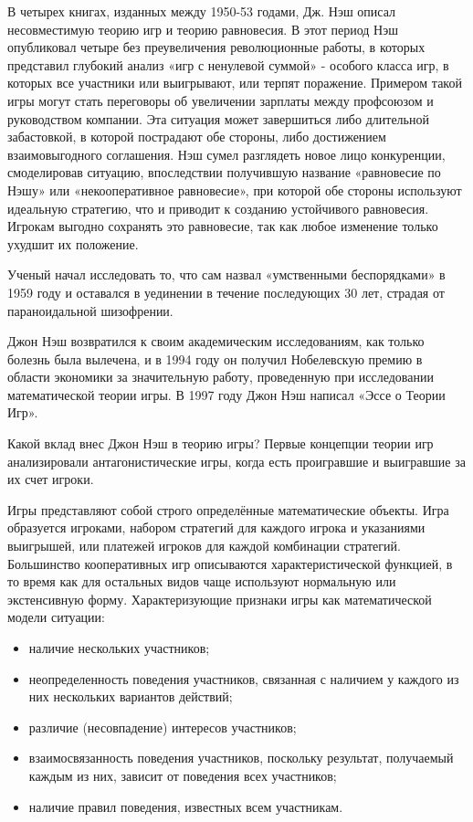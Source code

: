 \documentclass[12pt, a4paper]{article}
\begin{document}
В четырех книгах, изданных между 1950-53 годами, Дж. Нэш описал несовместимую
теорию игр и теорию равновесия. В этот период Нэш опубликовал четыре без
преувеличения революционные работы, в которых представил глубокий анализ
«игр с ненулевой суммой» - особого класса игр, в которых все участники или
выигрывают, или терпят поражение. Примером такой игры могут стать
переговоры об увеличении зарплаты между профсоюзом и руководством компании.
Эта ситуация может завершиться либо длительной забастовкой, в которой
пострадают обе стороны, либо достижением взаимовыгодного соглашения. Нэш сумел
разглядеть новое лицо конкуренции, смоделировав ситуацию, впоследствии
получившую название «равновесие по Нэшу» или «некооперативное равновесие»,
при которой обе стороны используют идеальную стратегию, что и приводит к
созданию устойчивого равновесия. Игрокам выгодно сохранять это равновесие,
так как любое изменение только ухудшит их положение\cite{vm03}.

Ученый начал исследовать то, что сам назвал «умственными беспорядками» в
1959 году и оставался в уединении в течение последующих 30 лет, страдая от
параноидальной шизофрении.

Джон Нэш возвратился к своим академическим исследованиям, как только болезнь
была вылечена, и в 1994 году он получил Нобелевскую премию в области экономики
за значительную работу, проведенную при исследовании математической теории
игры. В 1997 году Джон Нэш написал «Эссе о Теории Игр».

Какой вклад внес Джон Нэш в теорию игры?
Первые концепции теории игр анализировали антагонистические игры, когда
есть проигравшие и выигравшие за их счет игроки.

Игры представляют собой строго определённые математические объекты. Игра
образуется игроками, набором стратегий для каждого игрока и указаниями
выигрышей, или платежей игроков для каждой комбинации стратегий. Большинство
кооперативных игр описываются характеристической функцией, в то время как
для остальных видов чаще используют нормальную или экстенсивную форму.
Характеризующие признаки игры как математической модели ситуации:
\begin{itemize}
\item наличие нескольких участников;

\item неопределенность поведения участников, связанная с наличием у каждого
    из них нескольких вариантов действий;

\item различие (несовпадение) интересов участников;

\item взаимосвязанность поведения участников, поскольку результат, получаемый
    каждым из них, зависит от поведения всех участников;

\item наличие правил поведения, известных всем участникам.
\end{itemize}
\end{document}

